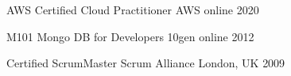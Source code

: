 


\begin{cvhonors}


\cvhonor
{AWS Certified Cloud Practitioner} %
{AWS} %
{online} %
{2020} %


\cvhonor
{M101 Mongo DB for Developers} %
{10gen} %
{online} %
{2012} %


\cvhonor
{Certified ScrumMaster} %
{Scrum Alliance} %
{London, UK} %
{2009} %


\end{cvhonors}
